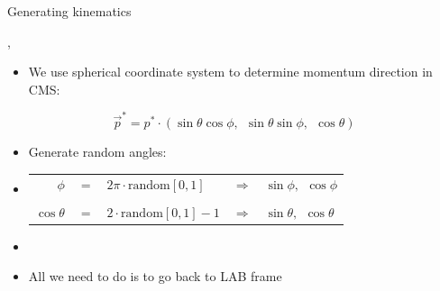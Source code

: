 \begin{slide}[toc=]{Generating kinematics}
\null\vfill

  \twocolumn
  {
    \sep
    \begin{itemize}
      \item We use spherical coordinate system to determine momentum direction in CMS:
    \end{itemize}
    $$\vec p^* = p^* \cdot (\sin\theta\cos\phi,~~\sin\theta\sin\phi,~~\cos\theta)$$
  }
  {
    \centering
  }  

  \begin{itemize}
    \item Generate random angles:  
    \item[]
    
    \begin{tabular}{rclll}
           $\phi$ & $ = $ &  $2\pi\cdot\mbox{random}[0,1]$ & $\Rightarrow$ & $\sin\phi,~~\cos\phi$ \\ \\
     $\cos\theta$ & $ = $ & $2\cdot\mbox{random}[0,1] - 1$ & $\Rightarrow$ & $\sin\theta, ~~\cos\theta$  
    \end{tabular}
    
    \item[]
    
    \item All we need to do is to go back to LAB frame

  \end{itemize}

\vfill\null
\end{slide}

